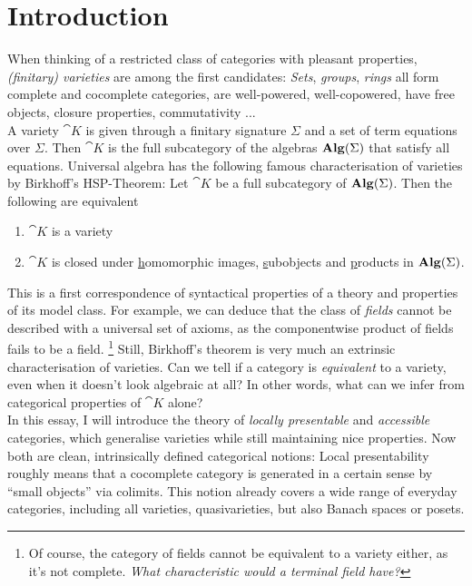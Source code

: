 \section*{Introduction}
{}

When thinking of a restricted class of categories with pleasant properties, \emph{(finitary) varieties} are among the first candidates: \emph{Sets}, \emph{groups}, \emph{rings} all form complete and cocomplete categories, are well-powered, well-copowered, have free objects, closure properties, commutativity ... \\

A variety $\cat K$ is given through a finitary signature $\Sigma$ and a set of term equations over $\Sigma$. Then $\cat K$ is the full subcategory of the algebras $\mathbf{Alg}(\Sigma)$ that satisfy all equations. Universal algebra has the following famous characterisation of varieties by Birkhoff's HSP-Theorem: Let $\cat K$ be a full subcategory of $\mathbf{Alg}(\Sigma)$. Then the following are equivalent
\begin{enumerate}
\item $\cat K$ is a variety
\item $\cat K$ is closed under \underline{h}omomorphic images, \underline{s}ubobjects and \underline{p}roducts in $\mathbf{Alg}(\Sigma)$.
\end{enumerate}
This is a first correspondence of syntactical properties of a theory and properties of its model class. For example, we can deduce that the class of \emph{fields} cannot be described with a universal set of axioms, as the componentwise product of fields fails to be a field. \footnote{Of course, the category of fields cannot be equivalent to a variety either, as it's not complete. \emph{What characteristic would a terminal field have?}}  Still, Birkhoff's theorem is very much an extrinsic characterisation of varieties. Can we tell if a category is \emph{equivalent} to a variety, even when it doesn't look algebraic at all? In other words, what can we infer from categorical properties of $\cat K$ alone? \\

In this essay, I will introduce the theory of \emph{locally presentable} and \emph{accessible} categories, which generalise varieties while still maintaining nice properties. Now both are clean, intrinsically defined categorical notions: Local presentability roughly means that a cocomplete category is generated in a certain sense by ``small objects'' via colimits. This notion already covers a wide range of everyday categories, including all varieties, quasivarieties, but also Banach spaces or posets. \\

